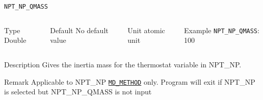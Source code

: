 \begin{frame}[allowframebreaks]{\texttt{NPT\_NP\_QMASS}} \label{NPT_NP_QMASS}
\vspace*{-12pt}
\begin{columns}
\begin{block}{Type}
Double
\end{block}

\begin{block}{Default}
No default value
\end{block}

\begin{block}{Unit}
atomic unit
\end{block}

\begin{block}{Example}
\texttt{NPT\_NP\_QMASS}: 100
\end{block}
\end{columns}

\begin{block}{Description}
Gives the inertia mass for the thermostat variable in NPT\_NP.
\end{block}

\begin{block}{Remark}
Applicable to NPT\_NP \hyperlink{MD_METHOD}{\texttt{MD\_METHOD}} only.
Program will exit if NPT\_NP is selected but NPT\_NP\_QMASS is not input
\end{block}

\end{frame}



